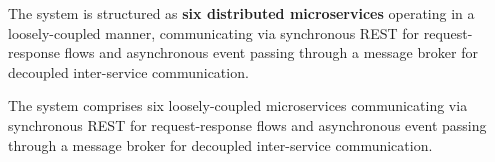 \documentclass[12pt,a4paper]{article}
\begin{document}
The system is structured as \textbf{six distributed microservices} operating in a loosely-coupled manner, communicating via synchronous 
REST for request-response flows and asynchronous event passing through a message 
broker for decoupled inter-service communication.


The system comprises six loosely-coupled microservices communicating via synchronous 
REST for request-response flows and asynchronous event passing through a message 
broker for decoupled inter-service communication.


\end{document}
